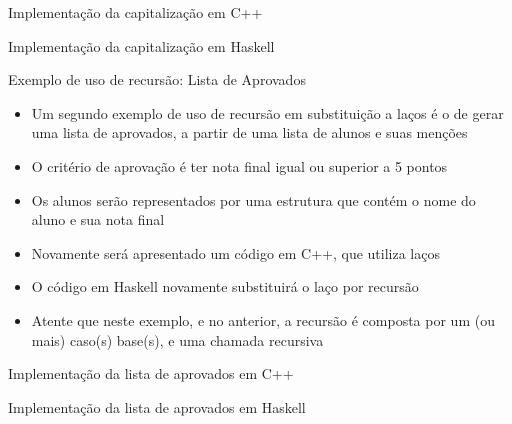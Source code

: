 \begin{frame}[fragile]{Implementação da capitalização em C++}
\end{frame}

\begin{frame}[fragile]{Implementação da capitalização em Haskell}
\end{frame}

\begin{frame}[fragile]{Exemplo de uso de recursão: Lista de Aprovados}

    \begin{itemize}
        \item Um segundo exemplo de uso de recursão em substituição a laços é o de gerar
            uma lista de aprovados, a partir de uma lista de alunos e suas menções

        \item O critério de aprovação é ter nota final igual ou superior a 5 pontos

        \item Os alunos serão representados por uma estrutura que contém o nome do aluno e
            sua nota final

        \item Novamente será apresentado um código em C++, que utiliza laços

        \item O código em Haskell novamente substituirá o laço por recursão

        \item Atente que neste exemplo, e no anterior, a recursão é composta por um (ou mais)
            caso(s) base(s), e uma chamada recursiva
    \end{itemize}

\end{frame}

\begin{frame}[fragile]{Implementação da lista de aprovados em C++}
\end{frame}

\begin{frame}[fragile]{Implementação da lista de aprovados em Haskell}
\end{frame}

